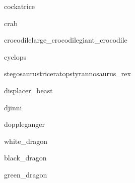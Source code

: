 \documentclass[a4paper,serif]{module}
\begin{document}
\begin{newmonster}{cockatrice}\end{newmonster}

\begin{newmonster}{crab}\end{newmonster}


\begin{newmonster3}{crocodile}{large_crocodile}{giant_crocodile}\end{newmonster3}

\begin{newmonster}{cyclops}\end{newmonster}


\begin{newmonster3}{stegosaurus}{triceratops}{tyrannosaurus_rex}\end{newmonster3}

\begin{newmonster}{displacer_beast}\end{newmonster}

\begin{newmonster}{djinni}\end{newmonster}

\begin{newmonster}{doppleganger}\end{newmonster}


\begin{newmonster}{white_dragon}\end{newmonster}

\begin{newmonster}{black_dragon}\end{newmonster}

\begin{newmonster}{green_dragon}\end{newmonster}
\end{document}
